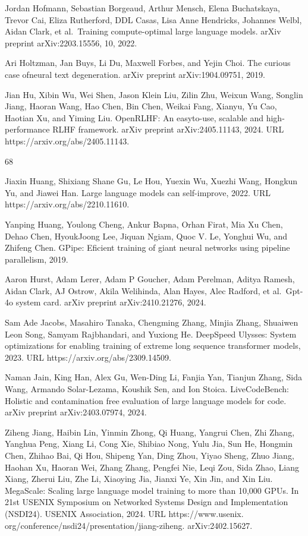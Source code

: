 \documentclass[
  10
]{article}
\begin{document}
Jordan Hofmann, Sebastian Borgeaud, Arthur Mensch, Elena Buchatskaya,
Trevor Cai, Eliza Rutherford, DDL Casas, Lisa Anne Hendricks, Johannes
Welbl, Aidan Clark, et al.~Training compute-optimal large language
models. arXiv preprint arXiv:2203.15556, 10, 2022.

Ari Holtzman, Jan Buys, Li Du, Maxwell Forbes, and Yejin Choi. The
curious case ofneural text degeneration. arXiv preprint
arXiv:1904.09751, 2019.

Jian Hu, Xibin Wu, Wei Shen, Jason Klein Liu, Zilin Zhu, Weixun Wang,
Songlin Jiang, Haoran Wang, Hao Chen, Bin Chen, Weikai Fang, Xianyu, Yu
Cao, Haotian Xu, and Yiming Liu. OpenRLHF: An easyto-use, scalable and
high-performance RLHF framework. arXiv preprint arXiv:2405.11143, 2024.
URL https://arxiv.org/abs/2405.11143.

68

Jiaxin Huang, Shixiang Shane Gu, Le Hou, Yuexin Wu, Xuezhi Wang, Hongkun
Yu, and Jiawei Han. Large language models can self-improve, 2022. URL
https://arxiv.org/abs/2210.11610.

Yanping Huang, Youlong Cheng, Ankur Bapna, Orhan Firat, Mia Xu Chen,
Dehao Chen, HyoukJoong Lee, Jiquan Ngiam, Quoc V. Le, Yonghui Wu, and
Zhifeng Chen. GPipe: Eficient training of giant neural networks using
pipeline parallelism, 2019.

Aaron Hurst, Adam Lerer, Adam P Goucher, Adam Perelman, Aditya Ramesh,
Aidan Clark, AJ Ostrow, Akila Welihinda, Alan Hayes, Alec Radford, et
al.~Gpt-4o system card. arXiv preprint arXiv:2410.21276, 2024.

Sam Ade Jacobs, Masahiro Tanaka, Chengming Zhang, Minjia Zhang, Shuaiwen
Leon Song, Samyam Rajbhandari, and Yuxiong He. DeepSpeed Ulysses: System
optimizations for enabling training of extreme long sequence transformer
models, 2023. URL https://arxiv.org/abs/2309.14509.

Naman Jain, King Han, Alex Gu, Wen-Ding Li, Fanjia Yan, Tianjun Zhang,
Sida Wang, Armando Solar-Lezama, Koushik Sen, and Ion Stoica.
LiveCodeBench: Holistic and contamination free evaluation of large
language models for code. arXiv preprint arXiv:2403.07974, 2024.

Ziheng Jiang, Haibin Lin, Yinmin Zhong, Qi Huang, Yangrui Chen, Zhi
Zhang, Yanghua Peng, Xiang Li, Cong Xie, Shibiao Nong, Yulu Jia, Sun He,
Hongmin Chen, Zhihao Bai, Qi Hou, Shipeng Yan, Ding Zhou, Yiyao Sheng,
Zhuo Jiang, Haohan Xu, Haoran Wei, Zhang Zhang, Pengfei Nie, Leqi Zou,
Sida Zhao, Liang Xiang, Zherui Liu, Zhe Li, Xiaoying Jia, Jianxi Ye, Xin
Jin, and Xin Liu. MegaScale: Scaling large language model training to
more than 10,000 GPUs. In 21st USENIX Symposium on Networked Systems
Design and Implementation (NSDI24). USENIX Association, 2024. URL
https://www.usenix. org/conference/nsdi24/presentation/jiang-ziheng.
arXiv:2402.15627.
\end{document}
